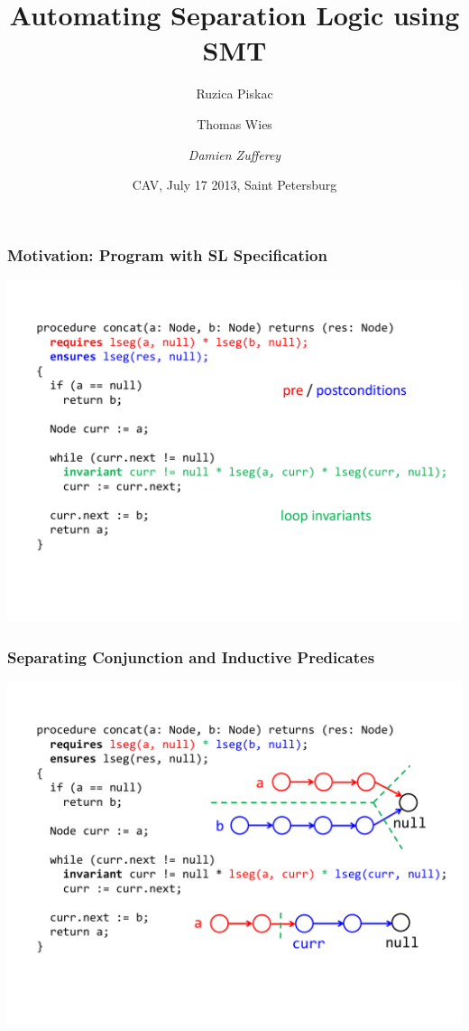 \documentclass{beamer}
\title[Automating Separation Logic using SMT]{Automating Separation Logic using SMT}
\author[Damien Zufferey]{
  Ruzica Piskac \and
  Thomas Wies \and
  \emph{Damien Zufferey}
}
\institute{ MPI-SWS \hspace{10mm} NYU \hspace{10mm} IST Austria }
\date{CAV, July 17 2013, Saint Petersburg}
\begin{document}
\frame[plain]{\titlepage}

\begin{frame}
  \frametitle{Motivation: Program with SL Specification}
  \includegraphics[scale=0.4]{resources/spec.pdf}
\end{frame}

\begin{frame}
  \frametitle{Separating Conjunction and Inductive Predicates}
  \includegraphics[scale=0.4]{resources/star.pdf}
\end{frame}
\end{document}
